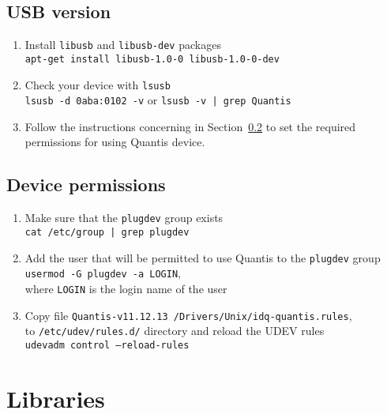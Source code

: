 \documentclass[a4paper,11pt]{article}
\newcommand{\QuantisDistVersion}{Quantis-v11.12.13}
\begin{document}
\subsection{USB version}\label{sec:usb-version}
\begin{enumerate}
    \item Install \texttt{libusb} and \texttt{libusb-dev} packages\\ 
    \texttt{apt-get install libusb-1.0-0 libusb-1.0-0-dev}

    \item Check your device with \texttt{lsusb}\\
    \texttt{lsusb -d 0aba:0102 -v} or \texttt{lsusb -v | grep Quantis}

    \item Follow the instructions concerning in Section~\ref{sec:permissions} to
    set the required permissions for using Quantis device.
\end{enumerate}


\subsection{Device permissions}\label{sec:permissions}
\begin{enumerate}
    \item Make sure that the \texttt{plugdev} group exists\\
    \texttt{cat /etc/group | grep plugdev}
    \item Add the user that will be permitted to use Quantis to the
    \texttt{plugdev} group\\ \texttt{usermod -G plugdev -a LOGIN},\\ where
    \texttt{LOGIN} is the login name of the user
    \item Copy file \texttt{\QuantisDistVersion
    /Drivers/Unix/idq-quantis.rules},\\ to \texttt{/etc/udev/rules.d/} directory
    and reload the UDEV rules\\ \texttt{udevadm control --reload-rules}
\end{enumerate}

\section{Libraries}
\end{document}

